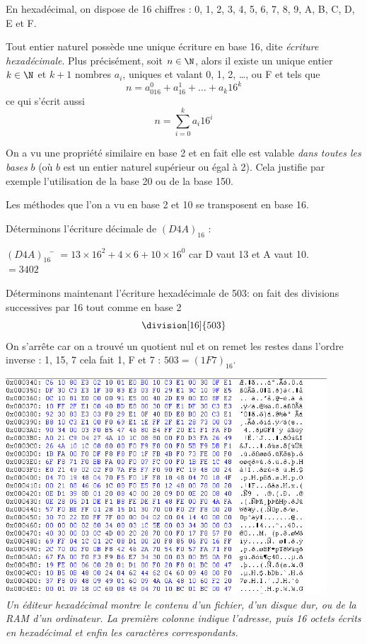 \documentclass[a4paper,12pt,french]{book}
\begin{document}
En hexadécimal, on dispose de 16 chiffres : 0, 1, 2, 3, 4, 5, 6, 7, 8, 9, A, B, C, D, E et F.

\begin{propriete}
Tout entier naturel possède une unique écriture en base 16, dite \textit{écriture hexadécimale}.
Plus précisément, soit $n\in\N$, alors il existe un unique entier $k\in\N$ et $k+1$ nombres $a_i$, uniques et valant 0, 1, 2, \ldots, ou F et tels
que $$n=a_016^0+a_16^1+\ldots+a_k16^k$$
ce qui s'écrit aussi
 $$n=\sum_{i=0}^ka_i16^i$$
\end{propriete}

\begin{remarque}
On a vu une propriété similaire en base 2 et en fait elle est valable \textit{dans toutes les bases}  $b$ (où $b$ est un entier naturel supérieur ou
égal à 2). Cela justifie par exemple l'utilisation de la base 20 ou de la base 150.
\end{remarque}

Les méthodes que l'on a vu en base 2 et 10 se transposent en base 16.
\begin{methode}
Déterminons l'écriture décimale de $(D4A)_{16}$ :
\begin{tabbing}
	$(D4A)_{16}$  	\= $=13\times 16^2 + 4\times 6 + 10\times 16^0$	 car D vaut 13 et A vaut 10.\\
		\>	$=3402$
\end{tabbing}
\end{methode}
\begin{methode}
	Déterminons maintenant l'écriture hexadécimale de 503: on fait des divisions successives par 16 tout comme en base 2
	$$\division[16]{503}$$
	On s'arrête car on a trouvé un quotient nul et on remet les restes dans l'ordre inverse : 1, 15, 7 cela fait 1, F et 7 : $503=(1F7)_{16}$.
\end{methode}
\begin{center}
\includegraphics[width=12cm]{hex.png}\\
\textit{Un éditeur hexadécimal montre le contenu d'un fichier, d'un disque dur, ou de la RAM d'un ordinateur. La première colonne indique l'adresse,
puis 16 octets écrits en hexadécimal et enfin les caractères correspondants.}
\end{center}
\end{document}
